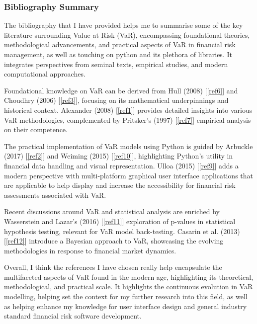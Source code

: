 \documentclass{article}
\begin{document}
\subsubsection{Bibliography Summary}

The bibliography that I have provided helps me to summarise some of the key literature surrounding Value at Risk (VaR), encompassing foundational theories, methodological advancements, and practical aspects of VaR in financial risk management, as well as touching on python and its plethora of libraries. It integrates perspectives from seminal texts, empirical studies, and modern computational approaches.\\\vspace{0.3cm}

Foundational knowledge on VaR can be derived from Hull (2008) [\ref{ref6}] and Choudhry (2006) [\ref{ref3}], focusing on its mathematical underpinnings and historical context. Alexander (2008) [\ref{ref1}] provides detailed insights into various VaR methodologies, complemented by Pritsker's (1997) [\ref{ref7}] empirical analysis on their competence.\\\vspace{0.3cm}

The practical implementation of VaR models using Python is guided by Arbuckle (2017) [\ref{ref2}] and Weiming (2015) [\ref{ref10}], highlighting Python's utility in financial data handling and visual representation. Ulloa (2015) [\ref{ref9}]  adds a modern perspective with multi-platform graphical user interface applications that are applicable to help display and increase the accessibility for financial risk assessments associated with VaR.\\\vspace{0.3cm}

Recent discussions around VaR and statistical analysis are enriched by Wasserstein and Lazar's (2016) [\ref{ref11}] exploration of p-values in statistical hypothesis testing, relevant for VaR model back-testing. Casarin et al. (2013) [\ref{ref12}] introduce a Bayesian approach to VaR, showcasing the evolving methodologies in response to financial market dynamics.\\\vspace{0.3cm}

Overall, I think the references I have chosen really help encapsulate the multifaceted aspects of VaR found in the modern age, highlighting its theoretical, methodological, and practical scale. It highlights the continuous evolution in VaR modelling, helping set the context for my further research into this field, as well as helping enhance my knowledge for user interface design and general industry standard financial risk software development.
\end{document}
